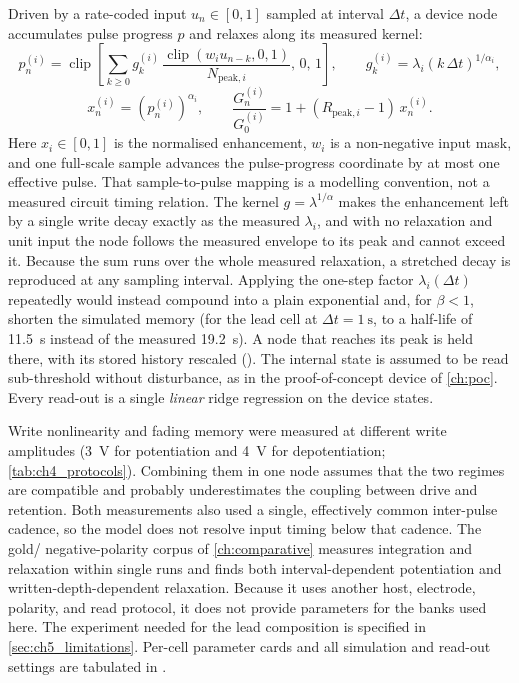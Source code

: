 \documentclass[12pt, twoside]{report}
\begin{document}
Driven by a rate-coded input $u_n \in [0,1]$ sampled at interval $\Delta t$, a device node accumulates pulse progress $p$ and relaxes along its measured kernel:
\[
  p^{(i)}_n=\operatorname{clip}\!\left[\sum_{k\geq 0} g^{(i)}_k\,
    \frac{\operatorname{clip}(w_i u_{n-k},0,1)}{N_{\mathrm{peak},i}},\,0,\,1\right],
  \qquad
  g^{(i)}_k=\lambda_i(k\,\Delta t)^{1/\alpha_i},
\]
\[
  x^{(i)}_n=(p^{(i)}_n)^{\alpha_i},\qquad
  \frac{G^{(i)}_n}{G^{(i)}_0}=1+(R_{\mathrm{peak},i}-1)\,x^{(i)}_n .
\]
Here $x_i\in[0,1]$ is the normalised enhancement, $w_i$ is a non-negative input mask, and one full-scale sample advances the pulse-progress coordinate by at most one effective pulse. That sample-to-pulse mapping is a modelling convention, not a measured circuit timing relation. The kernel $g=\lambda^{1/\alpha}$ makes the enhancement left by a single write decay exactly as the measured $\lambda_i$, and with no relaxation and unit input the node follows the measured envelope to its peak and cannot exceed it. Because the sum runs over the whole measured relaxation, a stretched decay is reproduced at any sampling interval. Applying the one-step factor $\lambda_i(\Delta t)$ repeatedly would instead compound into a plain exponential and, for $\beta<1$, shorten the simulated memory (for the lead cell at $\Delta t=\SI{1}{\second}$, to a half-life of \SI{11.5}{\second} instead of the measured \SI{19.2}{\second}). A node that reaches its peak is held there, with its stored history rescaled (). The internal state is assumed to be read sub-threshold without disturbance, as in the proof-of-concept device of \cref{ch:poc}. Every read-out is a single \emph{linear} ridge regression on the device states.

Write nonlinearity and fading memory were measured at different write amplitudes (\SI{3}{\volt} for potentiation and \SI{4}{\volt} for depotentiation; \cref{tab:ch4_protocols}). Combining them in one node assumes that the two regimes are compatible and probably underestimates the coupling between drive and retention. Both measurements also used a single, effectively common inter-pulse cadence, so the model does not resolve input timing below that cadence. The gold/\TMPE{} negative-polarity corpus of \cref{ch:comparative} measures integration and relaxation within single runs and finds both interval-dependent potentiation and written-depth-dependent relaxation. Because it uses another host, electrode, polarity, and read protocol, it does not provide parameters for the banks used here. The experiment needed for the lead composition is specified in \cref{sec:ch5_limitations}. Per-cell parameter cards and all simulation and read-out settings are tabulated in .
\end{document}
